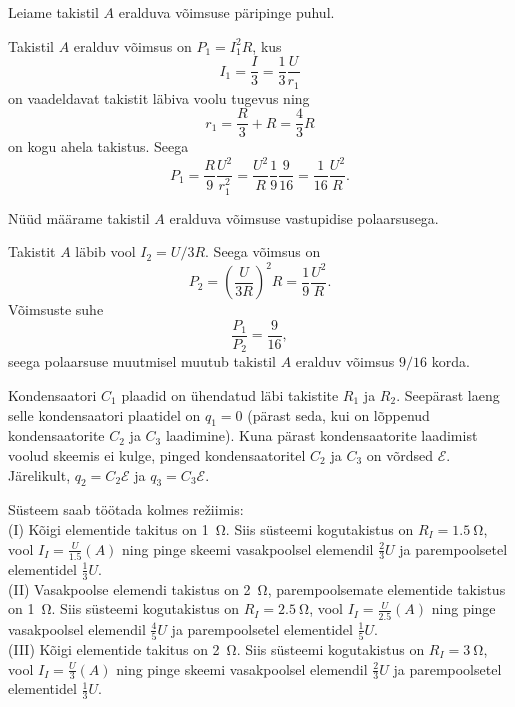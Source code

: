 \documentclass[10pt, twoside]{article}
\begin{document}
{Leiame takistil $A$ eralduva võimsuse päripinge puhul. 

Takistil $A$ eralduv võimsus on $P_1 = I_1^2R$, kus
\[
I_1 = \frac{I}{3} = \frac{1}{3} \frac{U}{r_1}
\]
on vaadeldavat takistit läbiva voolu tugevus ning
\[
r_1 = \frac{R}{3} + R = \frac{4}{3} R
\]
on kogu ahela takistus. Seega
\[
P_1=\frac{R}{9} \frac{U^{2}}{r_{1}^{2}}=\frac{U^{2}}{R} \frac{1}{9} \frac{9}{16}=\frac{1}{16} \frac{U^{2}}{R}.
\]

Nüüd määrame takistil $A$ eralduva võimsuse vastupidise polaarsusega. 

Takistit $A$ läbib vool $I_2 = U/3R$. Seega võimsus on
\[
P_{2}=\left(\frac{U}{3 R}\right)^{2} R=\frac{1}{9} \frac{U^{2}}{R}.
\]
Võimsuste suhe
\[
\frac{P_1}{P_2} = \frac{9}{16},
\]
seega polaarsuse muutmisel muutub takistil $A$ eralduv võimsus $9/16$ korda.
\probend
\bigskip


\solu
Kondensaatori $C_1$ plaadid on ühendatud läbi takistite $R_1$ ja $R_2$. Seepärast laeng selle kondensaatori plaatidel on $q_1 = 0$ (pärast seda, kui on lõppenud kondensaatorite $C_2$ ja $C_3$ laadimine). Kuna pärast kondensaatorite laadimist voolud skeemis ei kulge, pinged kondensaatoritel $C_2$ ja $C_3$ on võrdsed $\mathcal E$. Järelikult, $q_2 = C_2\mathcal E$ ja $q_3 = C_3\mathcal E$.
\probend
\bigskip


\solu
Süsteem saab töötada kolmes režiimis:\\
(I) Kõigi elementide takitus on \SI{1}{\ohm}. Siis süsteemi kogutakistus on $R_I = \SI{1,5}{\ohm}$, vool $I_I = \frac{U}{\num{1,5}}(\si{A})$ ning pinge skeemi vasakpoolsel elemendil $\frac{2}{3}U$ ja parempoolsetel elementidel $\frac 13U$.\\
(II) Vasakpoolse elemendi takistus on \SI{2}{\ohm}, parempoolsemate elementide takistus on \SI{1}{\ohm}. Siis süsteemi kogutakistus on $R_I = \SI{2,5}{\ohm}$, vool $I_I = \frac{U}{\num{2,5}}(\si{A})$ ning pinge vasakpoolsel elemendil $\frac 45U$ ja parempoolsetel elementidel $\frac 15U$.\\
(III) Kõigi elementide takitus on \SI{2}{\ohm}. Siis süsteemi kogutakistus on $R_I = \SI{3}{\ohm}$, vool $I_I = \frac U3(A)$ ning pinge skeemi vasakpoolsel elemendil $\frac 23U$ ja parempoolsetel elementidel $\frac 13U$.

}
\end{document}
